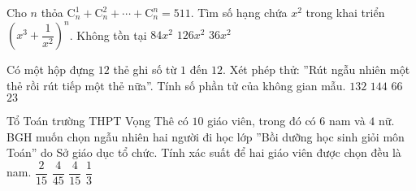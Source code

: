 \begin{ex}%
	Cho $n$ thỏa $\mathrm{C}^1_n +\mathrm{C}^2_n+ \cdots +\mathrm{C}^n_n=511$. Tìm số hạng chứa $x^2$ trong khai triển $\left(x^3+\dfrac{1}{x^2}\right)^n$.
	\choice
	{Không tồn tại}
	{$84x^2$}
	{\True $126x^2$}
	{$36x^2$}
\end{ex}
\begin{ex}%
	Có một hộp đựng $12$ thẻ ghi số từ $1$ đến $12$. Xét phép thử: ''Rút ngẫu nhiên một thẻ rồi rút tiếp một thẻ nữa''. Tính số phần tử của không gian mẫu.
	\choice
	{\True $132$}
	{$144$}
	{$66$}
	{$23$}
\end{ex}
\begin{ex}%
	Tổ Toán trường THPT Vọng Thê có $10$ giáo viên, trong đó có $6$ nam và $4$ nữ. BGH muốn chọn ngẫu nhiên hai người đi học lớp ''Bồi dưỡng học sinh giỏi môn Toán'' do Sở giáo dục tổ chức. Tính xác suất để hai giáo viên được chọn đều là nam.
	\choice
	{$\dfrac{2}{15}$}
	{$\dfrac{4}{45}$}
	{$\dfrac{4}{15}$}
	{\True $\dfrac{1}{3}$}
\end{ex}
